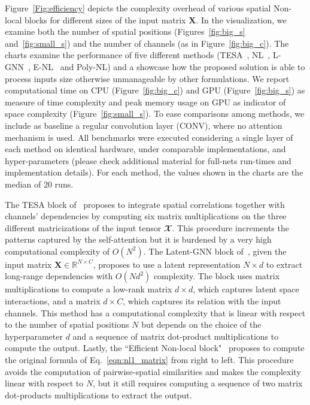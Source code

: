 \documentclass[10pt,twocolumn,letterpaper]{article}
\begin{document}
Figure~\ref{Fig:efficiency} depicts the complexity overhead of various spatial Non-local blocks for different sizes of the input matrix $\mathbf{X}$. In the visualization, we examine both the number of spatial positions (Figures~\ref{fig:big_s} and~\ref{fig:small_s}) and the number of channels (as in Figure~\ref{fig:big_c}). The charts examine the performance of five different methods (TESA~\cite{babiloni2020tesa}, NL~\cite{wang2018non}, L-GNN~\cite{zhang2019latentgnn}, E-NL~\cite{shen2021efficient} and Poly-NL) and a showcase how the proposed solution is able to process inputs size otherwise unmanageable by other formulations. We report computational time on CPU (Figure~\ref{fig:big_c}) and GPU (Figure~\ref{fig:big_s}) as measure of time complexity and peak memory usage on GPU as indicator of space complexity (Figure~\ref{fig:small_s}). To ease  comparisons among methods, we include as baseline a regular convolution layer (CONV), where no attention mechanism is used. All benchmarks were executed considering a single layer of each method on identical hardware, under comparable implementations, and hyper-parameters (please check additional material for full-nets run-times and implementation details). For each method, the values shown in the charts are the median of 20 runs.

The TESA block of~\cite{babiloni2020tesa} proposes to integrate spatial correlations together with channels' dependencies by computing six matrix multiplications on the three different matricizations of the input tensor $\mathbfcal{X}$. This procedure increments the patterns captured by the self-attention but it is burdened by a very high computational complexity of $O(N^2)$. The Latent-GNN block of~\cite{zhang2019latentgnn}, given the input matrix $\mathbf{X} \in \mathbb{R}^{N \times C}$, proposes to use a latent representation $N \times d$ to extract long-range dependencies with $O(N d^2)$ complexity. The block uses matrix multiplications to compute a low-rank matrix $d \times d$, which captures latent space interactions, and a matrix $d \times C$, which captures its relation with the input channels. This method has a computational complexity that is linear with respect to the number of spatial positions $N$ but depends on the choice of the hyperparameter $d$ and a sequence of matrix dot-product multiplications to compute the output. Lastly, the ``Efficient Non-local block"~\cite{shen2021efficient} proposes to compute the original formula of Eq.~\eqref{eqn:nl1_matrix} from right to left. This procedure avoids the computation of pairwise-spatial similarities and makes the complexity linear with respect to $N$, but it still requires computing a sequence of two matrix dot-products multiplications to extract the output. 
\end{document}
